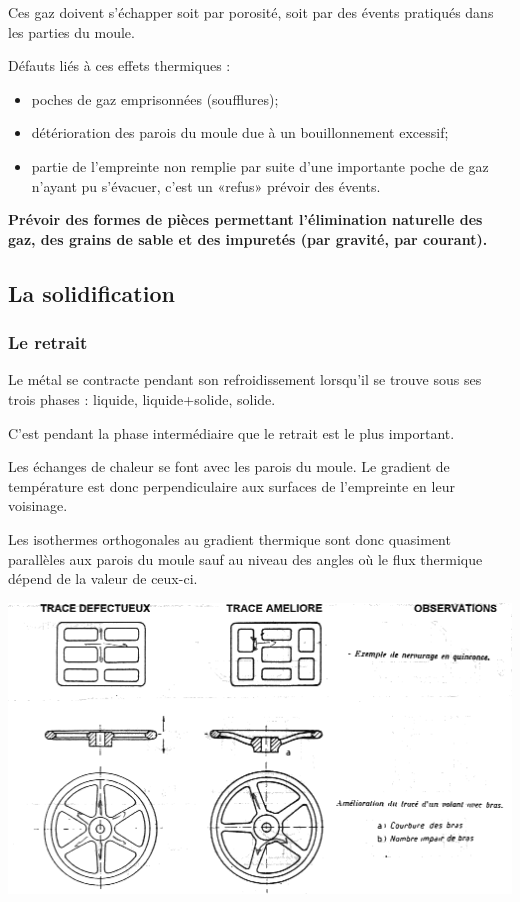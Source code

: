\documentclass[11pt,oneside]{article}
\begin{document}
Ces gaz doivent s'échapper soit par porosité, soit par des évents pratiqués
dans les parties du moule. 

Défauts liés à ces effets thermiques : 
\begin{itemize}
 \item poches de gaz emprisonnées (soufflures);
\item détérioration des parois du moule due à un bouillonnement excessif;
\item partie de l'empreinte non remplie par suite d'une importante poche de gaz
n'ayant pu s'évacuer, c'est un «refus» prévoir des évents. 
\end{itemize}


\textbf{Prévoir des formes de pièces permettant l'élimination naturelle des gaz,
des grains de sable et des impuretés (par gravité, par courant).}

\subsection{La solidification}

\subsubsection*{Le retrait}
Le métal se contracte pendant son refroidissement lorsqu'il se trouve sous ses
trois phases : liquide, liquide+solide, solide.

C'est pendant la phase intermédiaire que le retrait est le plus important. 

Les échanges de chaleur se font avec les parois du moule. Le gradient de
température est donc perpendiculaire aux surfaces de l'empreinte en leur
voisinage. 

Les isothermes orthogonales au gradient thermique sont donc quasiment
parallèles aux parois du moule sauf au niveau des angles où le flux thermique
dépend de la valeur de ceux-ci.

\begin{center}
\includegraphics[width=.8\textwidth]{png/regles_retrait}
\end{center}
\end{document}
